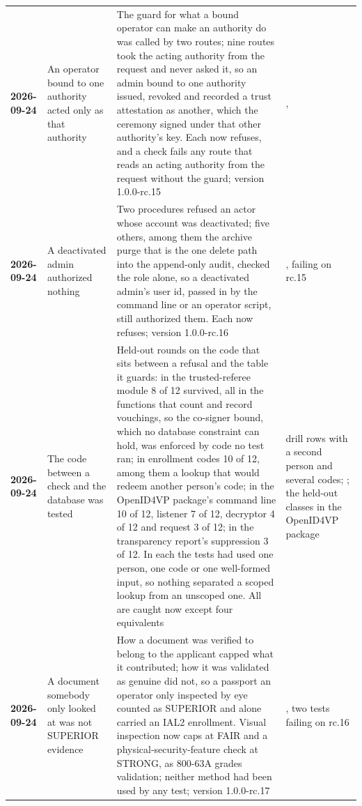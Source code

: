 {\begin{xltabular}{\textwidth}{>{\bfseries\hspace{0pt}}p{0.62in} >{\RaggedRight\arraybackslash\hspace{0pt}}X >{\RaggedRight\arraybackslash\hspace{0pt}}X >{\RaggedRight\arraybackslash\hspace{0pt}}p{1.6in}}
2026-09-24 & An operator bound to one authority acted only as that authority & The guard for what a bound operator can make an authority do was called by two routes; nine routes took the acting authority from the request and never asked it, so an admin bound to one authority issued, revoked and recorded a trust attestation as another, which the ceremony signed under that other authority's key. Each now refuses, and a check fails any route that reads an acting authority from the request without the guard; version 1.0.0-rc.15 & ,  \\
2026-09-24 & A deactivated admin authorized nothing & Two procedures refused an actor whose account was deactivated; five others, among them the archive purge that is the one delete path into the append-only audit, checked the role alone, so a deactivated admin's user id, passed in by the command line or an operator script, still authorized them. Each now refuses; version 1.0.0-rc.16 & , failing on rc.15 \\
2026-09-24 & The code between a check and the database was tested & Held-out rounds on the code that sits between a refusal and the table it guards: in the trusted-referee module 8 of 12 survived, all in the functions that count and record vouchings, so the co-signer bound, which no database constraint can hold, was enforced by code no test ran; in enrollment codes 10 of 12, among them a lookup that would redeem another person's code; in the OpenID4VP package's command line 10 of 12, listener 7 of 12, decryptor 4 of 12 and request 3 of 12; in the transparency report's suppression 3 of 12. In each the tests had used one person, one code or one well-formed input, so nothing separated a scoped lookup from an unscoped one. All are caught now except four equivalents & drill rows with a second person and several codes; ; the held-out classes in the OpenID4VP package \\
2026-09-24 & A document somebody only looked at was not SUPERIOR evidence & How a document was verified to belong to the applicant capped what it contributed; how it was validated as genuine did not, so a passport an operator only inspected by eye counted as SUPERIOR and alone carried an IAL2 enrollment. Visual inspection now caps at FAIR and a physical-security-feature check at STRONG, as 800-63A grades validation; neither method had been used by any test; version 1.0.0-rc.17 & , two tests failing on rc.16 \\

\end{xltabular}}
